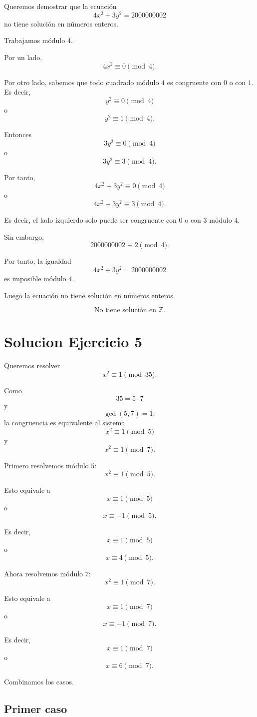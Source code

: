 \documentclass[12pt]{article}
\begin{document}
Queremos demostrar que la ecuación
\[
4x^2+3y^2=2000000002
\]
no tiene solución en números enteros.

Trabajamos módulo \(4\).

Por un lado,
\[
4x^2\equiv 0\pmod 4.
\]

Por otro lado, sabemos que todo cuadrado módulo \(4\) es congruente con \(0\) o con \(1\). Es decir,
\[
y^2\equiv 0\pmod 4
\]
o
\[
y^2\equiv 1\pmod 4.
\]

Entonces
\[
3y^2\equiv 0\pmod 4
\]
o
\[
3y^2\equiv 3\pmod 4.
\]

Por tanto,
\[
4x^2+3y^2\equiv 0\pmod 4
\]
o
\[
4x^2+3y^2\equiv 3\pmod 4.
\]

Es decir, el lado izquierdo solo puede ser congruente con \(0\) o con \(3\) módulo \(4\).

Sin embargo,
\[
2000000002\equiv 2\pmod 4.
\]

Por tanto, la igualdad
\[
4x^2+3y^2=2000000002
\]
es imposible módulo \(4\).

Luego la ecuación no tiene solución en números enteros.

\[
\boxed{\text{No tiene solución en } \mathbb{Z}.}
\]

\section*{Solucion Ejercicio 5}

Queremos resolver
\[
x^2\equiv 1\pmod {35}.
\]

Como
\[
35=5\cdot 7
\]
y
\[
\gcd(5,7)=1,
\]
la congruencia es equivalente al sistema
\[
x^2\equiv 1\pmod 5
\]
y
\[
x^2\equiv 1\pmod 7.
\]

Primero resolvemos módulo \(5\):
\[
x^2\equiv 1\pmod 5.
\]

Esto equivale a
\[
x\equiv 1\pmod 5
\]
o
\[
x\equiv -1\pmod 5.
\]

Es decir,
\[
x\equiv 1\pmod 5
\]
o
\[
x\equiv 4\pmod 5.
\]

Ahora resolvemos módulo \(7\):
\[
x^2\equiv 1\pmod 7.
\]

Esto equivale a
\[
x\equiv 1\pmod 7
\]
o
\[
x\equiv -1\pmod 7.
\]

Es decir,
\[
x\equiv 1\pmod 7
\]
o
\[
x\equiv 6\pmod 7.
\]

Combinamos los casos.

\subsection*{Primer caso}
\end{document}
